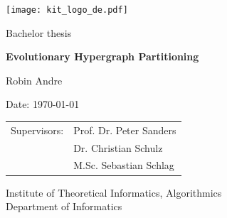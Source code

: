 \documentclass[a4paper,12pt,titlepage, BCOR7mm,headsepline]{scrbook}
\numberwithin{equation}{section}
\begin{document}
%


\pagestyle{empty} %
\renewcommand{\thepage}{\roman{page}}

\begin{titlepage}

  \begin{center}\large
  \begin{flushleft}
    \quad\texttt{[image: kit\_logo\_de.pdf]} \hfill

\end{flushleft}
    \vfill
    \vfill
    \vfill
    \vfill

    Bachelor thesis
    \vspace*{2cm}

    {\bf\huge Evolutionary Hypergraph Partitioning  \par}

    \vfill

    Robin Andre

    \vspace*{15mm}

    Date: \today 

    \vspace*{40mm}
    \begin{tabular}{rl}
      Supervisors: & Prof. Dr. Peter Sanders \\
      & Dr. Christian Schulz \\
      & M.Sc. Sebastian Schlag
    \end{tabular}
    
    \vspace*{10mm}


    \vspace*{10mm}
     Institute of Theoretical Informatics, Algorithmics \\
     Department of Informatics \\

    \vspace*{12mm}
    \vfill
  \end{center}

\end{titlepage}
\end{document}
